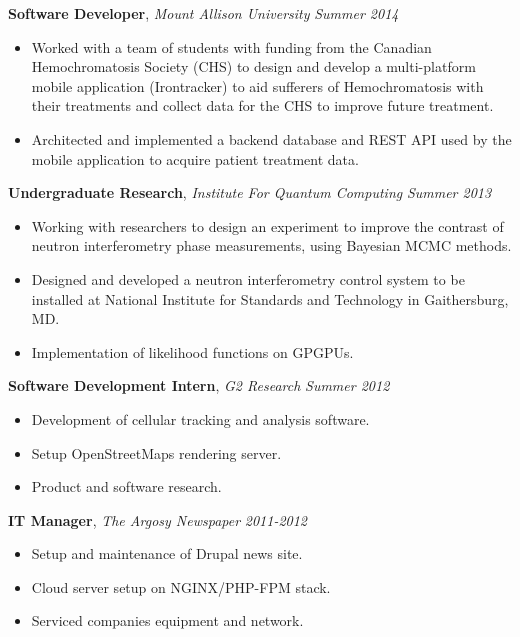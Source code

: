 \documentclass[9pt]{article}
\newenvironment{changemargin}[2]{%
  \begin{list}{}{%
    \setlength{\topsep}{0pt}%
    \setlength{\leftmargin}{#1}%
    \setlength{\rightmargin}{#2}%
    \setlength{\listparindent}{\parindent}%
    \setlength{\itemindent}{\parindent}%
    \setlength{\parsep}{\parskip}%
  }%
  \item[]}{\end{list}
}
\newenvironment{body} {
	\vspace*{-16pt}
	\begin{changemargin}{-0.25in}{-0.5in}
  }	
	{\end{changemargin}
}
\begin{document}
\begin{body}
\begin{itemize}
	\end{itemize}
	\textbf{Software Developer}, \emph{Mount Allison University} \hfill \emph{Summer 2014}\\
	\vspace*{-4pt}
	\begin{itemize} \itemsep -0pt  %
		\item Worked with a team of students with funding from the Canadian Hemochromatosis Society (CHS) to design and develop a multi-platform mobile application 
		(Irontracker) to aid sufferers of Hemochromatosis with their treatments and collect data for the CHS to improve future treatment. 
		\item Architected and implemented a backend database and REST API used by the mobile application to acquire patient treatment data.
	\end{itemize}
	\textbf{Undergraduate Research}, \emph{Institute For Quantum Computing} \hfill \emph{Summer 2013}\\
	\vspace*{-4pt}
	\begin{itemize} \itemsep -0pt  %
		\item Working with researchers to design an experiment to improve the contrast of neutron interferometry phase measurements, using Bayesian MCMC methods.  
		\item Designed and developed a neutron interferometry control system to be installed at National Institute for Standards and Technology in Gaithersburg, MD.
		\item Implementation of likelihood functions on GPGPUs. 
	\end{itemize}
	\textbf{Software Development Intern}, \emph{G2 Research} \hfill \emph{Summer 2012}\\
	\vspace*{-4pt}
	\begin{itemize} \itemsep -0pt  %
		\item Development of cellular tracking and analysis software.
		\item Setup OpenStreetMaps rendering server.
		\item Product and software research.
	\end{itemize}

	\textbf {IT Manager}, \emph{The Argosy Newspaper} \hfill \emph{2011-2012}\\
	\vspace*{-4pt}
	\begin{itemize} \itemsep -0pt
		\item Setup and maintenance of Drupal news site.
		\item Cloud server setup on NGINX/PHP-FPM stack. 
		\item Serviced companies equipment and network. 
	\end{itemize}


\end{body}
\end{document}
